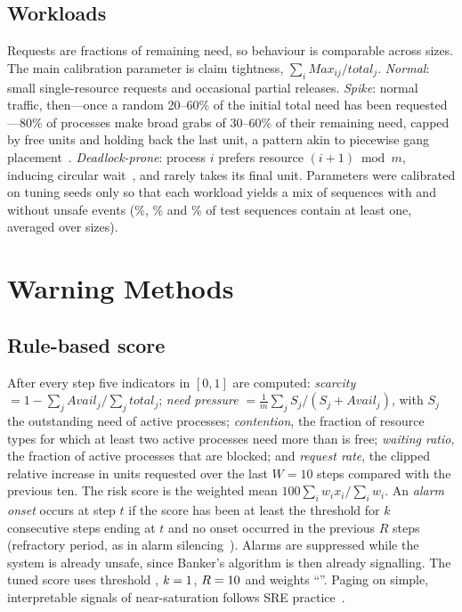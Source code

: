 \documentclass[conference]{IEEEtran}
\begin{document}
\subsection{Workloads}
Requests are fractions of remaining need, so behaviour is comparable across sizes. The main calibration parameter is claim tightness, $\sum_i\mathit{Max}_{ij}/\mathit{total}_j$. \textit{Normal}: small single-resource requests and occasional partial releases. \textit{Spike}: normal traffic, then---once a random 20--60\% of the initial total need has been requested---80\% of processes make broad grabs of 30--60\% of their remaining need, capped by free units and holding back the last unit, a pattern akin to piecewise gang placement~\cite{Jayaram2019FfDL}. \textit{Deadlock-prone}: process $i$ prefers resource $(i{+}1)\bmod m$, inducing circular wait~\cite{Coffman1971}, and rarely takes its final unit. Parameters were calibrated on tuning seeds only so that each workload yields a mix of sequences with and without unsafe events (\WithEventNormal\%, \WithEventSpike\% and \WithEventDlp\% of test sequences contain at least one, averaged over sizes).

\section{Warning Methods}
\subsection{Rule-based score}
After every step five indicators in $[0,1]$ are computed: \emph{scarcity} $=1-\sum_j\mathit{Avail}_j/\sum_j\mathit{total}_j$; \emph{need pressure} $=\frac{1}{m}\sum_j S_j/(S_j+\mathit{Avail}_j)$, with $S_j$ the outstanding need of active processes; \emph{contention}, the fraction of resource types for which at least two active processes need more than is free; \emph{waiting ratio}, the fraction of active processes that are blocked; and \emph{request rate}, the clipped relative increase in units requested over the last $W{=}10$ steps compared with the previous ten. The risk score is the weighted mean $100\sum_i w_ix_i/\sum_i w_i$. An \emph{alarm onset} occurs at step $t$ if the score has been at least the threshold for $k$ consecutive steps ending at $t$ and no onset occurred in the previous $R$ steps (refractory period, as in alarm silencing~\cite{Hyland2020}). Alarms are suppressed while the system is already unsafe, since Banker's algorithm is then already signalling. The tuned score uses threshold \CombTh, $k=1$, $R=10$ and weights ``\CombW''. Paging on simple, interpretable signals of near-saturation follows SRE practice~\cite{Ewaschuk2016SRE}.
\end{document}
